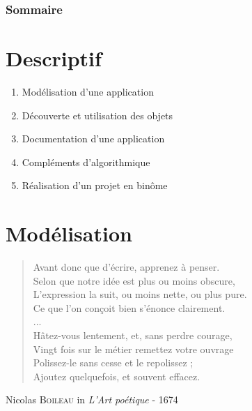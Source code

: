 \documentclass[french]{beamer}
\begin{document}
\begin{frame}
 \frametitle{Sommaire}
{\scriptsize
\begin{multicols}{2} 
 \tableofcontents
\end{multicols}
}

 
 \end{frame}

\normalsize





\section{Descriptif}

\begin{frame}
  \begin{enumerate}
  \item Modélisation d'une application
  \item Découverte et utilisation des objets
  \item Documentation d'une application
  \item Compléments d'algorithmique
  \item Réalisation d'un projet en binôme
  \end{enumerate}
\end{frame}


\section{Modélisation}

\begin{frame}
  \begin{quote}
    Avant donc que d'écrire, apprenez à penser.\\
Selon que notre idée est plus ou moins obscure,\\
L'expression la suit, ou moins nette, ou plus pure.\\
Ce que l'on conçoit bien s'énonce clairement.\\
...\\
Hâtez-vous lentement, et, sans perdre courage,\\
Vingt fois sur le métier remettez votre ouvrage\\
Polissez-le sans cesse et le repolissez ;\\
Ajoutez quelquefois, et souvent effacez. \\
\end{quote}

\pause

\begin{flushright}
  Nicolas \textsc{Boileau} in \textit{L'Art poétique} - 1674
\end{flushright}
\end{frame}
\end{document}
